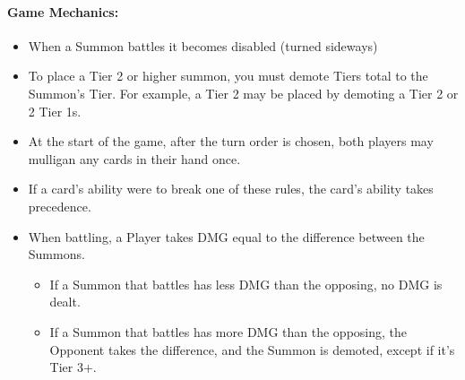 \documentclass[12pt, letterpaper]{article}
\begin{document}
\paragraph{Game Mechanics: \\}
\begin{itemize}
    \item When a Summon battles it becomes disabled (turned sideways)
    \item To place a Tier 2 or higher summon, you must demote Tiers total to the Summon's Tier. 
    For example, a Tier 2 may be placed by demoting a Tier 2 or 2 Tier 1s.
    \item At the start of the game, after the turn order is chosen, both players may mulligan any cards in their hand once.
    \item If a card’s ability were to break one of these rules, the card's ability takes precedence.
    \item When battling, a Player takes DMG equal to the difference between the Summons. 
    \begin{itemize}
        \item If a Summon that battles has less DMG than the opposing, no DMG is dealt.
        \item If a Summon that battles has more DMG than the opposing, the Opponent takes the difference, 
        and the Summon is demoted, except if it's Tier 3+. 
    \end{itemize} 
\end{itemize}
\end{document}
